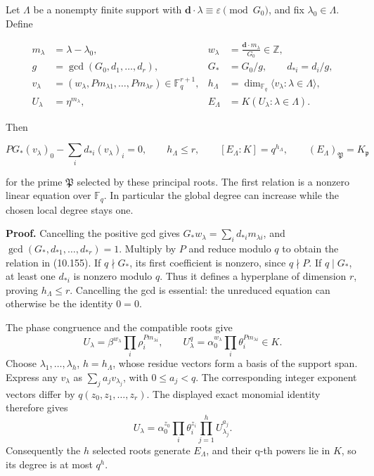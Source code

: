 \documentclass[
  11pt,
  a4paper,
]{article}
\newcounter{none} %
\begin{document}
Let \(\Lambda\) be a nonempty finite support with
\(\boldsymbol d\cdot\lambda\equiv\varepsilon\pmod{G_0}\), and fix
\(\lambda_0\in\Lambda\). Define

\[
\begin{aligned}
m_\lambda&=\lambda-\lambda_0,&
w_\lambda&=\frac{\boldsymbol d\cdot m_\lambda}{G_0}\in\mathbb Z,\\
g&=\gcd(G_0,d_1,\ldots,d_r),&
G_*&=G_0/g,\qquad d_{*i}=d_i/g,\\
v_\lambda&=(w_\lambda,Pm_{\lambda1},\ldots,Pm_{\lambda r})
\in\mathbb F_q^{r+1},&
h_\Lambda&=\dim_{\mathbb F_q}\langle v_\lambda:\lambda\in\Lambda\rangle,\\
U_\lambda&=\eta^{m_\lambda},&
E_\Lambda&=K(U_\lambda:\lambda\in\Lambda).
\end{aligned}
\tag{10.154}
\]

Then

\[
P G_*(v_\lambda)_0-\sum_i d_{*i}(v_\lambda)_i=0,\qquad
h_\Lambda\le r,\qquad
[E_\Lambda:K]=q^{h_\Lambda},\qquad
(E_\Lambda)_{\mathfrak P}=K_{\mathfrak p}
\tag{10.155}
\]

for the prime \(\mathfrak P\) selected by these principal roots. The
first relation is a nonzero linear equation over \(\mathbb F_q\). In
particular the global degree can increase while the chosen local degree
stays one.

\textbf{Proof.} Cancelling the positive gcd gives
\(G_*w_\lambda=\sum_i d_{*i}m_{\lambda i}\), and
\(\gcd(G_*,d_{*1},\ldots,d_{*r})=1\). Multiply by \(P\) and reduce
modulo \(q\) to obtain the relation in (10.155). If \(q\nmid G_*\), its
first coefficient is nonzero, since \(q\nmid P\). If \(q\mid G_*\), at
least one \(d_{*i}\) is nonzero modulo \(q\). Thus it defines a
hyperplane of dimension \(r\), proving \(h_\Lambda\le r\). Cancelling
the gcd is essential: the unreduced equation can otherwise be the
identity \(0=0\).

The phase congruence and the compatible roots give \[
U_\lambda=\beta^{w_\lambda}\prod_i\rho_i^{Pm_{\lambda i}},
\qquad
U_\lambda^q=\alpha_0^{w_\lambda}\prod_i\theta_i^{Pm_{\lambda i}}\in K.
\] Choose \(\lambda_1,\ldots,\lambda_h\), \(h=h_\Lambda\), whose residue
vectors form a basis of the support span. Express any \(v_\lambda\) as
\(\sum_j a_jv_{\lambda_j}\), with \(0\le a_j<q\). The corresponding
integer exponent vectors differ by \(q(z_0,z_1,\ldots,z_r)\). The
displayed exact monomial identity therefore gives \[
U_\lambda=\alpha_0^{z_0}\prod_i\theta_i^{z_i}
\prod_{j=1}^h U_{\lambda_j}^{a_j}.
\] Consequently the \(h\) selected roots generate \(E_\Lambda\), and
their q-th powers lie in \(K\), so its degree is at most \(q^h\).
\end{document}
